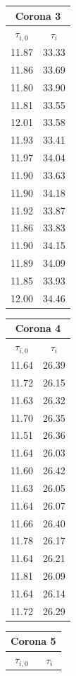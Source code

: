 \documentclass[a4paper]{article}
\begin{document}
\begin{table}[!ht]
\begin{tabular}{|c|c|}
    \hline
    \multicolumn{2}{|c|}{Corona 3} \\
    \hline 
    $\tau_{i,0}$ & $\tau_i$ \\
    \hline
    11.87 & 33.33 \\
    11.86 & 33.69 \\
    11.80 & 33.90 \\
    11.81 & 33.55 \\ 
    12.01 & 33.58 \\
    11.93 & 33.41 \\
    11.97 & 34.04 \\
    11.90 & 33.63 \\
    11.90 & 34.18 \\
    11.92 & 33.87 \\
    11.86 & 33.83 \\
    11.90 & 34.15 \\
    11.89 & 34.09 \\
    11.85 & 33.93 \\
    12.00 & 34.46 \\
    \hline
    \end{tabular}
    \quad
    \begin{tabular}{|c|c|}
    \hline
    \multicolumn{2}{|c|}{Corona 4} \\
    \hline 
    $\tau_{i,0}$ & $\tau_i$ \\
    \hline
    11.64 & 26.39 \\
    11.72 & 26.15 \\
    11.63 & 26.32 \\
    11.70 & 26.35 \\
    11.51 & 26.36 \\
    11.64 & 26.03 \\
    11.60 & 26.42\\
    11.63 & 26.05\\
    11.64 & 26.07\\
    11.66 & 26.40\\
    11.78 & 26.17\\
    11.64 & 26.21\\
    11.81 & 26.09\\
    11.64 & 26.14\\
    11.72 & 26.29\\
    \hline
    \end{tabular}
    \quad
    \begin{tabular}{|c|c|}
    \hline
    \multicolumn{2}{|c|}{Corona 5} \\
    \hline 
    $\tau_{i,0}$ & $\tau_i$ \\

\end{tabular}
\end{table}
\end{document}
